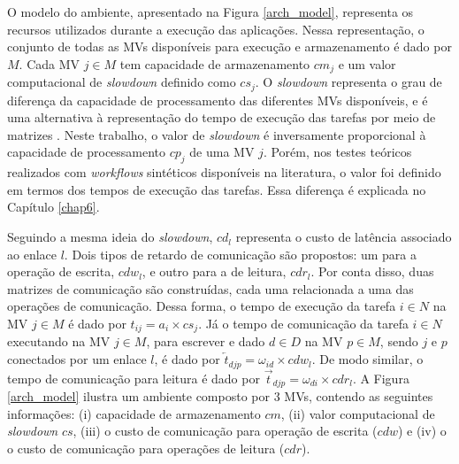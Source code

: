 O modelo do ambiente, apresentado na Figura \ref{arch_model}, representa os recursos utilizados durante a execução das aplicações. Nessa representação, o conjunto de todas as MVs disponíveis para execução e armazenamento é dado por $M$. Cada MV $j \in M$ tem capacidade de armazenamento $cm_j$ e um valor computacional de \textit{slowdown} definido como $cs_j$. O \textit{slowdown} representa o grau de diferença da capacidade de processamento das diferentes MVs disponíveis, e é uma alternativa à representação do tempo de execução das tarefas por meio de matrizes \cite{nascimento}. Neste trabalho, o valor de \textit{slowdown} é inversamente proporcional à capacidade de processamento $cp_j$ de uma MV $j$. Porém, nos testes teóricos realizados com \textit{workflows} sintéticos disponíveis na literatura, o valor foi definido em termos dos tempos de execução das tarefas. Essa diferença é explicada no Capítulo \ref{chap6}.




Seguindo a mesma ideia do \textit{slowdown}, $cd_{l}$  representa o custo de latência associado ao enlace $l$. Dois tipos de retardo de comunicação são propostos: um para a operação de escrita, $cdw_{l}$, e outro para a de leitura, $cdr_{l}$. Por conta disso, duas matrizes de comunicação são construídas, cada uma relacionada a uma das operações de comunicação.  Dessa forma, o tempo de execução da tarefa $i \in N$ na MV $j \in M$ é dado por $t_{ij} = a_i \times cs_j$. Já o tempo de comunicação da tarefa $i \in N$ executando na MV $j \in M$, para escrever e dado $d \in D$ na MV $p \in M$, sendo $j$ e $p$ conectados por um enlace $l$, é dado por $\overleftarrow{t}_{djp} = \omega_{id} \times cdw_{l}$. De modo similar, o tempo de comunicação para leitura é dado por $\overrightarrow{t}_{djp} =  \omega_{di} \times cdr_{l}$. A Figura \ref{arch_model} ilustra um ambiente composto por 3 MVs, contendo as seguintes informações: (i) capacidade de armazenamento $cm$, (ii) valor computacional de \textit{slowdown} $cs$, (iii) o custo de comunicação para operação de escrita ($cdw$) e (iv) o o custo de comunicação para operações de leitura ($cdr$).

